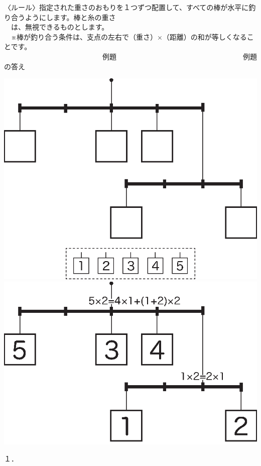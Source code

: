 \documentclass[./main]{subfiles}
\begin{document}
\noindent 〈ルール〉指定された重さのおもりを１つずつ配置して、すべての棒が水平に釣り合うようにします。棒と糸の重さ\\
　は、無視できるものとします。\\
　※棒が釣り合う条件は、支点の左右で（重さ）×（距離）の和が等しくなることです。\\[15pt]
　　　　　　　　　　　　　　例題　　　　　　　　　　　　　　　　　　例題の答え
\begin{center}
\includegraphics[scale=0.6]{morikawa_image/morikawa_puzzle_inst_p.eps}　　　　　
\includegraphics[scale=0.6]{morikawa_image/morikawa_puzzle_inst_a.eps}
\end{center}
１．
\end{document}

